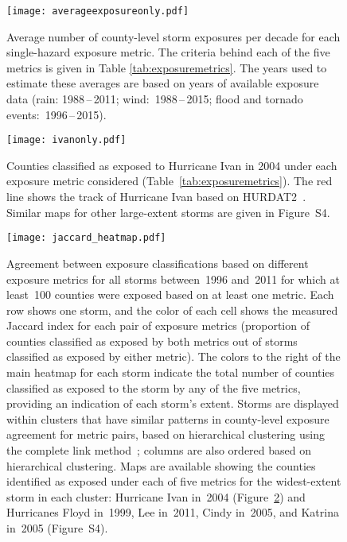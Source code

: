 \clearpage

\begin{figure}%
\centering
\texttt{[image: averageexposureonly.pdf]} 
\caption{Average number of county-level storm exposures per decade for each
	single-hazard exposure metric. The criteria behind each of the five
	metrics is given in Table \ref{tab:exposuremetrics}. The years used to
	estimate these averages are based on years of available exposure data
	(rain: 1988\,--\,2011; wind:~1988\,--\,2015; flood and
	tornado events:~1996\,--\,2015). } 
\label{fig:averageexposure} 
\end{figure}

\clearpage

\begin{figure}%
\centering
\texttt{[image: ivanonly.pdf]}
\caption{Counties classified as exposed to Hurricane Ivan in 2004 under each
	exposure metric considered (Table~\ref{tab:exposuremetrics}). The red
	line shows the track of Hurricane Ivan based on
	\ac{HURDAT2}~\parencite{landsea2013}.  Similar maps for other
	large-extent storms are given in Figure~S4.
	}
\label{fig:ivanexposure} 
\end{figure}

\clearpage

\begin{figure}%
\centering 
\texttt{[image: jaccard\_heatmap.pdf]} 
\caption{Agreement between exposure classifications based on different
         exposure metrics for all storms between~1996 and~2011 for which 
	 at least~100 counties were exposed based on at least one metric.
	 Each row shows one storm, and the color of each cell shows the 
	 measured Jaccard index for each pair of exposure metrics 
	 (proportion of counties classified as exposed by both metrics out 
	 of storms classified as exposed by either metric). The colors to the 
	 right of the main heatmap for each storm indicate the total number of 
	 counties classified as exposed to the storm by any of the five metrics, 
	 providing an indication of each storm's extent. Storms are displayed 
	 within clusters that have similar patterns in county-level exposure 
	 agreement for metric pairs, based on hierarchical clustering using the 
	 complete link method~\parencite{murtagh2012algorithms}; columns are also 
	 ordered based on hierarchical clustering. Maps are available showing the 
	 counties identified as exposed under each of five metrics for the widest-extent 
	 storm in each cluster: Hurricane Ivan in~2004 (Figure~\ref{fig:ivanexposure}) 
	 and Hurricanes Floyd in~1999, Lee in~2011, Cindy in~2005, and Katrina 
	 in~2005 (Figure~S4).
} 
\label{fig:jaccard}
\end{figure}

